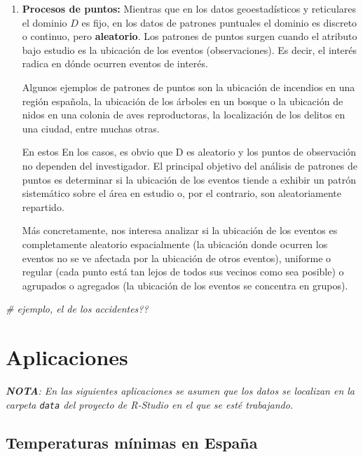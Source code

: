 \documentclass[
]{book}
\newenvironment{Shaded}{\begin{snugshade}}{\end{snugshade}}
\newcommand{\CommentTok}[1]{\textcolor[rgb]{0.56,0.35,0.01}{\textit{#1}}}
\begin{document}
\begin{enumerate}
\def\labelenumi{\arabic{enumi}.}
\setcounter{enumi}{2}
\item
  \textbf{Procesos de puntos:} Mientras que en los datos geoestadísticos y
  reticulares el dominio \(D\) es fijo, en los datos de patrones puntuales el
  dominio es discreto o continuo, pero \textbf{aleatorio}. Los patrones de puntos
  surgen cuando el atributo bajo estudio es la ubicación de los eventos
  (observaciones). Es decir, el interés radica en dónde ocurren eventos de
  interés.

  Algunos ejemplos de patrones de puntos son la ubicación de incendios en una
  región española, la ubicación de los árboles en un bosque o la ubicación de
  nidos en una colonia de aves reproductoras, la localización de los delitos
  en una ciudad, entre muchas otras.

  En estos En los casos, es obvio que D es aleatorio y los puntos de
  observación no dependen del investigador. El principal objetivo del análisis
  de patrones de puntos es determinar si la ubicación de los eventos tiende a
  exhibir un patrón sistemático sobre el área en estudio o, por el contrario,
  son aleatoriamente repartido.

  Más concretamente, nos interesa analizar si la ubicación de los eventos es
  completamente aleatorio espacialmente (la ubicación donde ocurren los
  eventos no se ve afectada por la ubicación de otros eventos), uniforme o
  regular (cada punto está tan lejos de todos sus vecinos como sea posible) o
  agrupados o agregados (la ubicación de los eventos se concentra en grupos).
\end{enumerate}

\begin{Shaded}
\begin{Highlighting}[]
\CommentTok{\# ejemplo, el de los accidentes??}
\end{Highlighting}
\end{Shaded}

\hypertarget{aplicaciones}{%
\chapter{Aplicaciones}\label{aplicaciones}}

\emph{\textbf{NOTA}: En las siguientes aplicaciones se asumen que los datos se localizan
en la carpeta \texttt{data} del proyecto de R-Studio en el que se esté trabajando.}

\hypertarget{temperaturas-muxednimas-en-espauxf1a}{%
\section{Temperaturas mínimas en España}\label{temperaturas-muxednimas-en-espauxf1a}}
\end{document}
